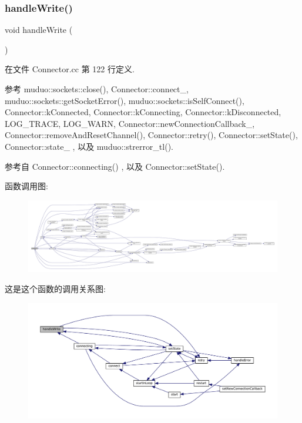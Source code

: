 \subsubsection{\texorpdfstring{handle\+Write()}{handleWrite()}}
{\footnotesize\ttfamily void handle\+Write (\begin{DoxyParamCaption}{ }\end{DoxyParamCaption})\hspace{0.3cm}{\ttfamily [private]}}



在文件 Connector.\+cc 第 122 行定义.



参考 muduo\+::sockets\+::close(), Connector\+::connect\+\_\+, muduo\+::sockets\+::get\+Socket\+Error(), muduo\+::sockets\+::is\+Self\+Connect(), Connector\+::k\+Connected, Connector\+::k\+Connecting, Connector\+::k\+Disconnected, L\+O\+G\+\_\+\+T\+R\+A\+CE, L\+O\+G\+\_\+\+W\+A\+RN, Connector\+::new\+Connection\+Callback\+\_\+, Connector\+::remove\+And\+Reset\+Channel(), Connector\+::retry(), Connector\+::set\+State(), Connector\+::state\+\_\+ , 以及 muduo\+::strerror\+\_\+tl().



参考自 Connector\+::connecting() , 以及 Connector\+::set\+State().

函数调用图\+:
\nopagebreak
\begin{figure}[H]
\begin{center}
\leavevmode
\includegraphics[width=350pt]{classmuduo_1_1Connector_ae1d79ff6580eaced59a900144818150d_cgraph}
\end{center}
\end{figure}
这是这个函数的调用关系图\+:
\nopagebreak
\begin{figure}[H]
\begin{center}
\leavevmode
\includegraphics[width=350pt]{classmuduo_1_1Connector_ae1d79ff6580eaced59a900144818150d_icgraph}
\end{center}
\end{figure}
\mbox{\label{classmuduo_1_1Connector_abf9772658904f185215158e0dbdf9610}} 
